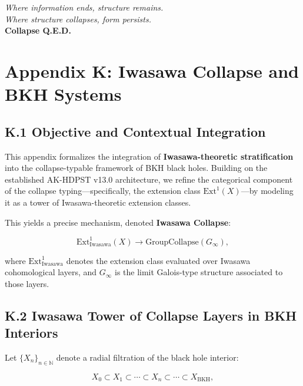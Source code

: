 \documentclass[11pt]{article}
\begin{document}
\begin{center}
\textit{Where information ends, structure remains.} \\
\textit{Where structure collapses, form persists.} \\
\textbf{Collapse Q.E.D.}
\end{center}



\section*{Appendix K: Iwasawa Collapse and BKH Systems}

\subsection*{K.1 Objective and Contextual Integration}

This appendix formalizes the integration of \textbf{Iwasawa-theoretic stratification} into the collapse-typable framework of BKH black holes. Building on the established AK-HDPST v13.0 architecture, we refine the categorical component of the collapse typing—specifically, the extension class \(\mathrm{Ext}^1(X)\)—by modeling it as a tower of Iwasawa-theoretic extension classes.

This yields a precise mechanism, denoted \textbf{Iwasawa Collapse}:

\[
\mathrm{Ext}^1_{\mathrm{Iwasawa}}(X) \longrightarrow \mathrm{GroupCollapse}(G_{\infty}),
\]

where \( \mathrm{Ext}^1_{\mathrm{Iwasawa}} \) denotes the extension class evaluated over Iwasawa cohomological layers, and \( G_{\infty} \) is the limit Galois-type structure associated to those layers.

\subsection*{K.2 Iwasawa Tower of Collapse Layers in BKH Interiors}

Let \( \{X_n\}_{n \in \mathbb{N}} \) denote a radial filtration of the black hole interior:

\[
X_0 \subset X_1 \subset \cdots \subset X_n \subset \cdots \subset X_{\mathrm{BKH}},
\]
\end{document}
